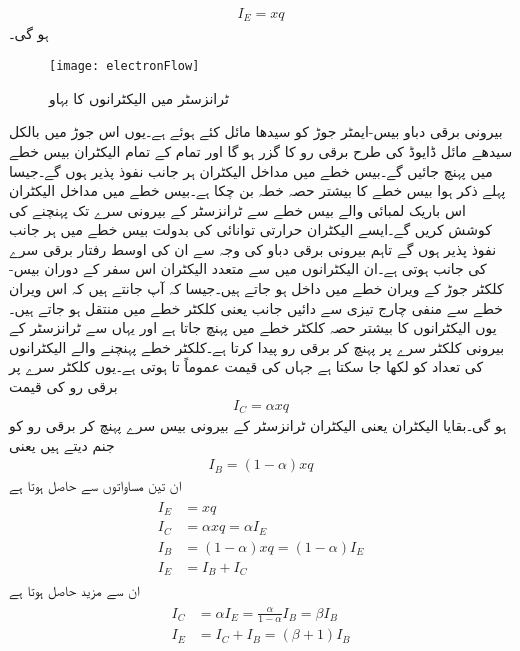 \begin{align}
I_E = x q
\end{align}
ہو گی۔
\begin{figure}
\centering
\texttt{[image: electronFlow]}
\caption{ ٹرانزسٹر میں الیکٹرانوں کا بہاو}
\label{شکل_ٹرانزسٹر_میں_الیکٹرانوں_کا_بہاو}
\end{figure}
	بیرونی برقی دباو بیس-ایمٹر  جوڑ کو سیدھا مائل کئے ہوئے ہے۔یوں اس جوڑ میں بالکل سیدھے مائل ڈایوڈ کی طرح برقی رو کا گزر ہو گا اور تمام کے تمام  الیکٹران بیس خطے میں پہنچ جائیں گے۔بیس خطے میں مداخل الیکٹران ہر جانب نفوذ پذیر ہوں گے۔جیسا پہلے ذکر ہوا بیس خطے کا بیشتر حصہ  خطہ بن چکا ہے۔بیس خطے میں مداخل الیکٹران اس باریک لمبائی والے بیس خطے سے ٹرانزسٹر کے بیرونی سرے   تک پہنچنے کی کوشش کریں گے۔ایسے الیکٹران حرارتی توانائی کی بدولت بیس خطے میں ہر جانب نفوذ پذیر ہوں گے تاہم بیرونی برقی دباو   کی وجہ سے ان کی اوسط رفتار برقی سرے   کی جانب ہوتی ہے۔ان الیکٹرانوں میں سے متعدد الیکٹران اس سفر کے دوران بیس-کلکٹر جوڑ کے ویران خطے میں داخل ہو جاتے ہیں۔جیسا کہ آپ جانتے ہیں کہ اس ویران  خطے سے منفی چارج تیزی سے دائیں جانب یعنی کلکٹر  خطے میں منتقل ہو جاتے ہیں۔یوں   الیکٹرانوں کا بیشتر حصہ کلکٹر  خطے میں پہنچ جاتا ہے اور یہاں سے ٹرانزسٹر کے بیرونی کلکٹر  سرے پر پہنچ کر برقی رو  پیدا کرتا ہے۔کلکٹر  خطے پہنچنے والے الیکٹرانوں کی تعداد کو  لکھا جا سکتا ہے جہاں  کی قیمت عموماً  تا  ہوتی ہے۔یوں کلکٹر  سرے پر برقی رو  کی قیمت
\begin{align}
I_C = \alpha x q
\end{align}
ہو گی۔بقایا الیکٹران یعنی الیکٹران ٹرانزسٹر کے بیرونی بیس سرے پہنچ کر برقی رو  کو جنم دیتے ہیں یعنی
\begin{align}
I_B = (1-\alpha) x q 
\end{align}
ان تین مساواتوں سے حاصل ہوتا ہے
\begin{gather}
\begin{aligned}
I_E &=x q\\
I_C &=\alpha x q =\alpha I_E\\
I_B& = (1-\alpha) x q =(1-\alpha) I_E \\
I_E & = I_B + I_C
\end{aligned}
\end{gather}
ان سے مزید حاصل ہوتا ہے
\begin{gather} \label{مساوات_ٹرانزسٹر_کلکٹر _اور_مخارج_رو}
\begin{aligned}
I_C &= \alpha I_E = \frac{\alpha}{1-\alpha} I_B = \beta I_B\\
I_E &= I_C+I_B = (\beta+1) I_B
\end{aligned}
\end{gather}
